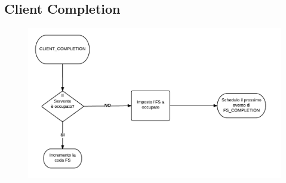 \subsection{Client Completion}
\begin{figure}[H]
  \centering
  \includegraphics[scale=0.45]{img/CLIENT_Completion.png}
  \label{fig:FS_Completion}
\end{figure}
